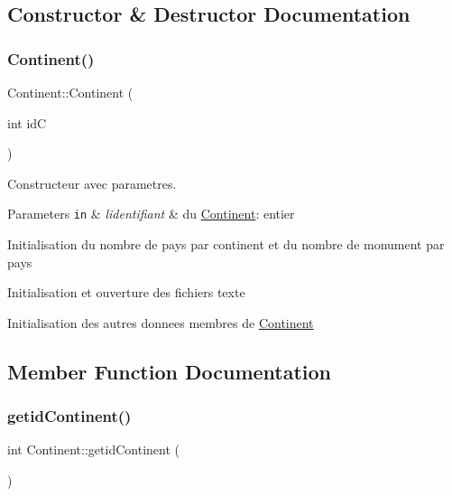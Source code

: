 \subsection{Constructor \& Destructor Documentation}
\mbox{\label{classContinent_aabc05191c73b118cd14f2eb71436962c}} 
\subsubsection{\texorpdfstring{Continent()}{Continent()}}
{\footnotesize\ttfamily Continent\+::\+Continent (\begin{DoxyParamCaption}\item[{int}]{idC }\end{DoxyParamCaption})}



Constructeur avec parametres. 


\begin{DoxyParams}[1]{Parameters}
\mbox{\tt in}  & {\em l\textquotesingle{}identifiant} & du \mbox{\hyperlink{classContinent}{Continent}}\+: entier \\
\hline
\end{DoxyParams}
Initialisation du nombre de pays par continent et du nombre de monument par pays

Initialisation et ouverture des fichiers texte

Initialisation des autres donnees membres de \mbox{\hyperlink{classContinent}{Continent}} 

\subsection{Member Function Documentation}
\mbox{\label{classContinent_ae3cfd254894dfd0f43f6804c257bf2f4}} 
\subsubsection{\texorpdfstring{getid\+Continent()}{getidContinent()}}
{\footnotesize\ttfamily int Continent\+::getid\+Continent (\begin{DoxyParamCaption}{ }\end{DoxyParamCaption})}



